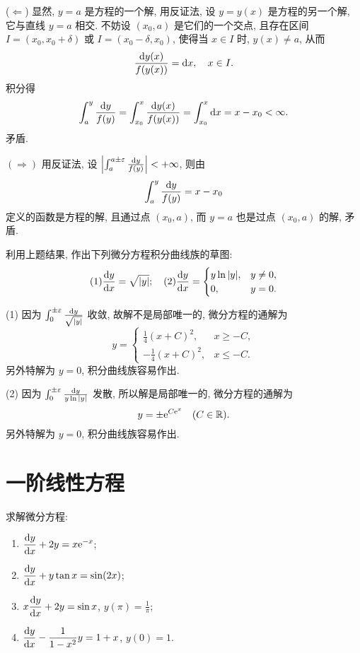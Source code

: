 \begin{solution}
  ($\Leftarrow$) 显然, $y=a$ 是方程的一个解, 用反证法, 设 $y=y(x)$ 是方程的另一个解, 
  它与直线 $y=a$ 相交. 不妨设 $(x_0,a)$ 是它们的一个交点, 
  且存在区间 $I=(x_0,x_0+\delta)$ 或 $I=(x_0-\delta,x_0)$, 
  使得当 $x\in I$ 时, $y(x)\neq a$, 从而
  \[\frac{\mathop{}\!\mathrm{d} y(x)}{f(y(x))}=\mathop{}\!\mathrm{d} x,\quad x\in I.\]
  积分得
  \[\int_a^y\frac{\mathop{}\!\mathrm{d} y}{f(y)}=\int_{x_0}^x\frac{\mathop{}\!\mathrm{d} y(x)}{f(y(x))}
    = \int_{x_0}^x\mathop{}\!\mathrm{d} x = x-x_0<\infty.\]
  矛盾.

  $(\Rightarrow)$ 用反证法, 设 $\left|\int_a^{a\pm\varepsilon}\frac{\mathop{}\!\mathrm{d} y}{f(y)}\right|<+\infty$,
  则由
  \[\int_a^y\frac{\mathop{}\!\mathrm{d} y}{f(y)}=x-x_0\]
  定义的函数是方程的解, 且通过点 $(x_0,a)$, 而 $y=a$ 也是过点 $(x_0,a)$ 的解, 矛盾.
\end{solution}



\begin{exercise}
  利用上题结果, 作出下列微分方程积分曲线族的草图:
  \[(1)\frac{\mathop{}\!\mathrm{d} y}{\mathop{}\!\mathrm{d} x}=\sqrt{|y|};\quad
  (2)\frac{\mathop{}\!\mathrm{d} y}{\mathop{}\!\mathrm{d} x}=
  \begin{cases}
    y\ln|y|, & y\neq 0, \\
    0,       & y=0.
  \end{cases}\]
\end{exercise}

\begin{solution}
(1) 因为 $\int_0^{\pm\varepsilon}\frac{\mathop{}\!\mathrm{d} y}{\sqrt{|y|}}$ 收敛, 故解不是局部唯一的, 微分方程的通解为
\[y=
  \begin{cases}
    \frac{1}{4}(x+C)^2,  & x\geq -C, \\
    -\frac{1}{4}(x+C)^2, & x\leq -C.
  \end{cases}\]
另外特解为 $y=0$, 积分曲线族容易作出.

(2) 因为 $\int_0^{\pm\varepsilon}\frac{\mathop{}\!\mathrm{d} y}{y\ln|y|}$ 发散, 所以解是局部唯一的, 微分方程的通解为
\[y=\pm\mathrm{e}^{C\mathrm{e}^x}\quad(C\in\mathbb{R}).\]
另外特解为 $y=0$, 积分曲线族容易作出.
\end{solution}



\section{一阶线性方程}



\begin{exercise}
  求解微分方程:
  \begin{enumerate}[(1)]
  \item $\displaystyle\frac{\mathop{}\!\mathrm{d} y}{\mathop{}\!\mathrm{d} x}+2y=x\mathrm{e}^{-x}$;
  \item $\displaystyle\frac{\mathop{}\!\mathrm{d} y}{\mathop{}\!\mathrm{d} x}+y\tan x=\sin(2x)$;
  \item $\displaystyle x\frac{\mathop{}\!\mathrm{d} y}{\mathop{}\!\mathrm{d} x}+2y=\sin x$, $y(\pi)=\frac{1}{\pi}$;
  \item $\displaystyle\frac{\mathop{}\!\mathrm{d} y}{\mathop{}\!\mathrm{d} x}-\frac{1}{1-x^2}y=1+x$, $y(0)=1$.
  \end{enumerate}
\end{exercise}


